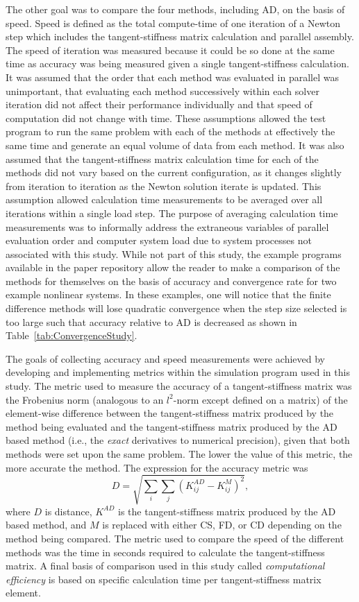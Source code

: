 \documentclass[preprint,12pt]{elsarticle}
\begin{document}
The other goal was to compare the four methods, including AD, on the basis of speed. Speed is defined as the total compute-time of one iteration of a Newton step which includes the tangent-stiffness matrix calculation and parallel assembly.  The speed of iteration was measured because it could be so done at the same time as accuracy was being measured given a single tangent-stiffness calculation.  It was assumed that the order that each method was evaluated in parallel was unimportant, that evaluating each method successively within each solver iteration did not affect their performance individually and that speed of computation did not change with time. These assumptions allowed the test program to run the same problem with each of the methods at effectively the same time and generate an equal volume of data from each method. It was also assumed that the tangent-stiffness matrix calculation time for each of the methods did not vary based on the current configuration, as it changes slightly from iteration to iteration as the Newton solution iterate is updated.  This assumption allowed calculation time measurements to be averaged over all iterations within a single load step. The purpose of averaging calculation time measurements was to informally address the extraneous variables of parallel evaluation order and computer system load due to system processes not associated with this study. While not part of this study, the example programs available in the paper repository allow the reader to make a comparison of the methods for themselves on the basis of accuracy and convergence rate for two example nonlinear systems. In these examples, one will notice that the finite difference methods will lose quadratic convergence when the step size selected is too large such that accuracy relative to AD is decreased as shown in Table~\ref{tab:ConvergenceStudy}.

The goals of collecting accuracy and speed measurements were achieved by developing and implementing metrics within the simulation program used in this study. The metric used to measure the accuracy of a tangent-stiffness matrix was the Frobenius norm (analogous to an $l^2$-norm except defined on a matrix) of the element-wise difference between the tangent-stiffness matrix produced by the method being evaluated and the tangent-stiffness matrix produced by the AD based method (i.e., the \emph{exact} derivatives to numerical precision), given that both methods were set upon the same problem. The lower the value of this metric, the more accurate the method. The expression for the accuracy metric was
%
\begin{equation} 
    D = \sqrt{\sum_i \sum_j(K^{AD}_{ij} - K^{M}_{ij})^2},
    \label{eqn:accuracy} 
\end{equation}
%
where $D$ is distance, $K^{AD}$ is the tangent-stiffness matrix produced by the AD based method, and $M$ is replaced with either CS, FD, or CD depending on the method being compared.  The metric used to compare the speed of the different methods was the time in seconds required to calculate the tangent-stiffness matrix. A final basis of comparison used in this study called \emph{computational efficiency} is based on specific calculation time per tangent-stiffness matrix element.
\end{document}
